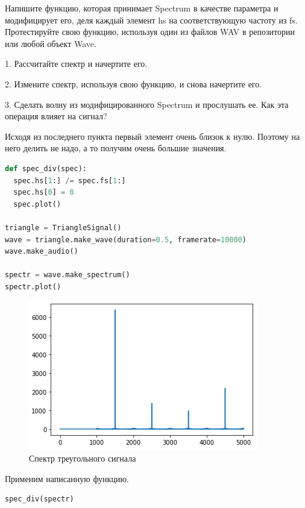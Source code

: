 Напишите функцию, которая принимает Spectrum в качестве параметра и модифицирует его, деля каждый элемент hs на соответствующую частоту из fs. Протестируйте свою функцию, используя один из файлов WAV в репозитории или любой объект Wave.

1. Рассчитайте спектр и начертите его.

2. Измените спектр, используя свою функцию, и снова начертите его.

3. Сделать волну из модифицированного Spectrum и прослушать ее. Как эта операция влияет на сигнал?


Исходя из последнего пункта первый элемент очень близок к нулю. Поэтому на него делить не надо, а то получим очень большие значения.

\begin{lstlisting}[language=Python]
def spec_div(spec):
  spec.hs[1:] /= spec.fs[1:]
  spec.hs[0] = 0
  spec.plot()

triangle = TriangleSignal()
wave = triangle.make_wave(duration=0.5, framerate=10000)
wave.make_audio()

spectr = wave.make_spectrum()
spectr.plot()
\end{lstlisting}

\begin{figure}[H]
	\begin{center}
		\includegraphics[scale=1]{fig/lab02/lab2_8.png}
		\caption{Спектр треугольного сигнала}
	\end{center}
\end{figure}

Применим написанную функцию.

\begin{lstlisting}[language=Python]
spec_div(spectr)
\end{lstlisting}

